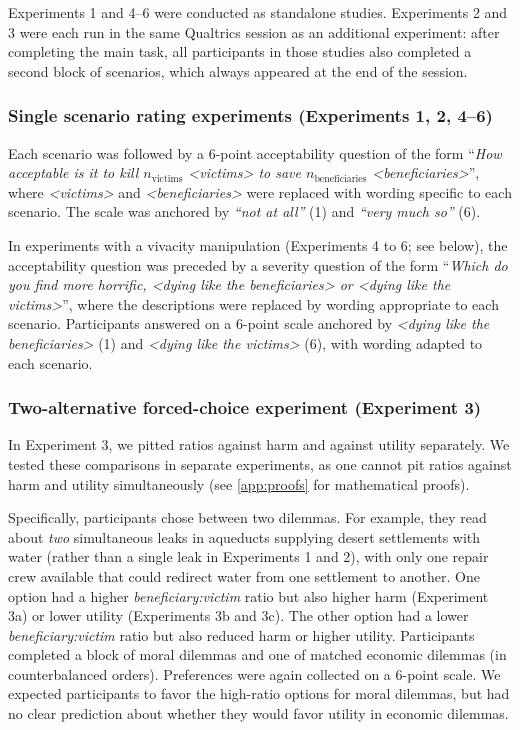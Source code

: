 \documentclass[
]{article}
\begin{document}
Experiments 1 and 4--6 were conducted as standalone studies. Experiments 2 and 3 were each run in the same Qualtrics session as an additional experiment: after completing the main task, all participants in those studies also completed a second block of scenarios, which always appeared at the end of the session.

\subsubsection{Single scenario rating experiments (Experiments 1, 2, 4--6)}\label{single-scenario-rating-experiments-experiments-1-2-46}

Each scenario was followed by a 6-point acceptability question of the form ``\emph{How acceptable is it to kill \(n_{\text{victims}}\) \textless victims\textgreater{} to save \(n_{\text{beneficiaries}}\) \textless beneficiaries\textgreater{}}'', where \emph{\textless victims\textgreater{}} and \emph{\textless beneficiaries\textgreater{}} were replaced with wording specific to each scenario. The scale was anchored by \emph{``not at all''} (1) and \emph{``very much so''} (6).

In experiments with a vivacity manipulation (Experiments 4 to 6; see below), the acceptability question was preceded by a severity question of the form ``\emph{Which do you find more horrific, \textless dying like the beneficiaries\textgreater{} or \textless dying like the victims\textgreater{}}'', where the descriptions were replaced by wording appropriate to each scenario. Participants answered on a 6-point scale anchored by \emph{\textless dying like the beneficiaries\textgreater{}} (1) and \emph{\textless dying like the victims\textgreater{}} (6), with wording adapted to each scenario.

\subsubsection{Two-alternative forced-choice experiment (Experiment 3)}\label{two-alternative-forced-choice-experiment-experiment-3}

In Experiment 3, we pitted ratios against harm and against utility separately. We tested these comparisons in separate experiments, as one cannot pit ratios against harm and utility simultaneously (see \ref{app:proofs} for mathematical proofs).

Specifically, participants chose between two dilemmas. For example, they read about \emph{two} simultaneous leaks in aqueducts supplying desert settlements with water (rather than a single leak in Experiments 1 and 2), with only one repair crew available that could redirect water from one settlement to another. One option had a higher \emph{beneficiary:victim} ratio but also higher harm (Experiment 3a) or lower utility (Experiments 3b and 3c). The other option had a lower \emph{beneficiary:victim} ratio but also reduced harm or higher utility. Participants completed a block of moral dilemmas and one of matched economic dilemmas (in counterbalanced orders). Preferences were again collected on a 6-point scale. We expected participants to favor the high-ratio options for moral dilemmas, but had no clear prediction about whether they would favor utility in economic dilemmas.
\end{document}
